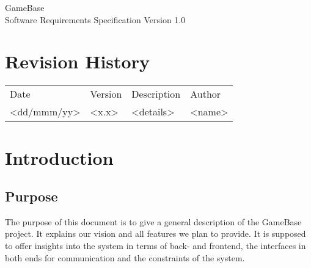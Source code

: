 \documentclass[a4paper,12pt,chapterprefix=false,bibliography=totoc,listof=totoc,]{scrreprt}
\begin{document}
\begin{flushright}
GameBase
\\
Software Requirements Specification
\bigbreak
Version 1.0
\end{flushright}
\chapter*{Revision History}
\begin{table}[H]
	\centering
	\everyrow{\hline}
	\begin{tabu} to \textwidth {|X[c]|X[c]|X[c]|X[c]|}
		Date & Version & Description & Author\\
		<dd/mmm/yy> & <x.x> & <details> & <name>
	\end{tabu}
	\label{tab:rev-hist}
\end{table}

\tableofcontents

\chapter{Introduction}



\section{Purpose}
The purpose of this document is to give a general description of the GameBase project. It explains our vision and all features we plan to provide. It is supposed to offer insights into the system in terms of back- and frontend, the interfaces in both ends for communication and the constraints of the system.
\end{document}
